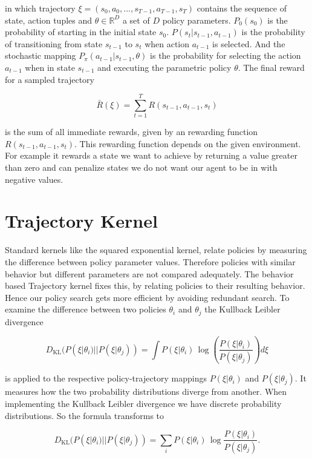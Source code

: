 in which trajectory $\xi=(s_{0},a_{0}, ..., s_{T-1}, a_{T-1}, s_{T})$ contains the sequence of state, action tuples and $\theta \in \mathbb{R}^{D}$ a set of $D$ policy parameters. $P_{0}(s_{0})$ is the probability of starting in the initial state $s_{0}$. $P(s_{t}|s_{t-1}, a_{t-1})$ is the probability of transitioning from state $s_{t-1}$ to $s_{t}$ when action $a_{t-1}$ is selected. And the stochastic mapping $P_{\pi}(a_{t-1}|s_{t-1},\theta)$ is the probability for selecting the action $a_{t-1}$ when in state $s_{t-1}$ and executing the parametric policy $\theta$. The final reward for a sampled trajectory

$$\bar{R}(\xi)=\sum_{t=1}^T R(s_{t-1}, a_{t-1}, s_{t})$$

is the sum of all immediate rewards, given by an rewarding function $R(s_{t-1}, a_{t-1}, s_{t})$. This rewarding function depends on the given environment. For example it rewards a state we want to achieve by returning a value greater than zero and can penalize states we do not want our agent to be in with negative values.

\section{Trajectory Kernel}
Standard kernels like the squared exponential kernel, relate policies by measuring the difference between policy parameter values. Therefore policies with similar behavior but different parameters are not compared adequately. The behavior based Trajectory kernel fixes this, by relating policies to their resulting behavior. Hence our policy search gets more efficient by avoiding redundant search. To examine the difference between two policies $\theta_{ i }$ and $\theta_{ j }$ the Kullback Leibler divergence

$$D_{\mathrm {KL} }(P(\xi|\theta_{ i })||P(\xi|\theta_{ j })) = \int{ P(\xi|\theta_{ i })\,\log\left(\frac{ P(\xi|\theta_{ i }) }{ P(\xi|\theta_{ j }) }\right)d\xi }$$

is applied to the respective policy-trajectory mappings $P(\xi|\theta_{ i })$ and $P(\xi|\theta_{ j })$. It measures how the two probability distributions diverge from another. When implementing the Kullback Leibler divergence we have discrete probability distributions. So the formula transforms to

$$D_{\mathrm {KL} }(P(\xi|\theta_{ i })||P(\xi|\theta_{ j })) = \sum _{i}P(\xi|\theta_{ i })\,\log {\frac {P(\xi|\theta_{ i })}{P(\xi|\theta_{ j })}}.$$

